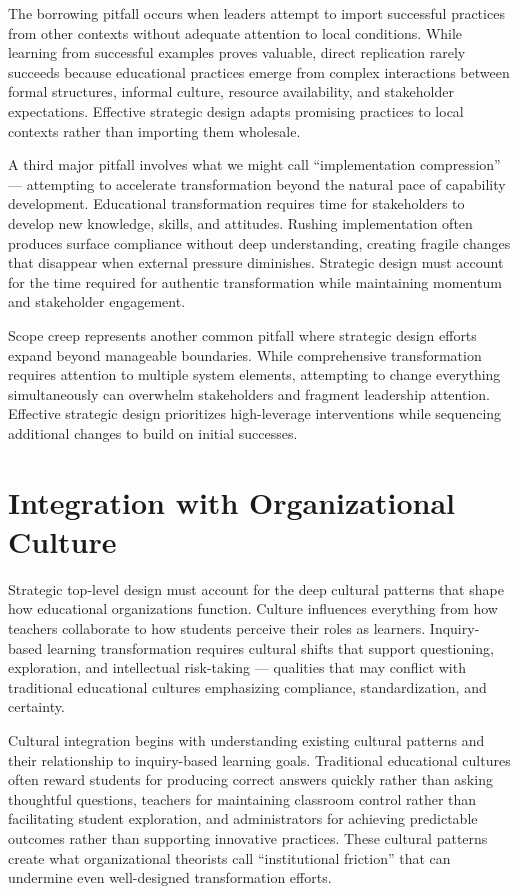 \documentclass[
  Letterpaper,
]{scrbook}
\begin{document}
The borrowing pitfall occurs when leaders attempt to import successful
practices from other contexts without adequate attention to local
conditions. While learning from successful examples proves valuable,
direct replication rarely succeeds because educational practices emerge
from complex interactions between formal structures, informal culture,
resource availability, and stakeholder expectations. Effective strategic
design adapts promising practices to local contexts rather than
importing them wholesale.

A third major pitfall involves what we might call ``implementation
compression'' --- attempting to accelerate transformation beyond the
natural pace of capability development. Educational transformation
requires time for stakeholders to develop new knowledge, skills, and
attitudes. Rushing implementation often produces surface compliance
without deep understanding, creating fragile changes that disappear when
external pressure diminishes. Strategic design must account for the time
required for authentic transformation while maintaining momentum and
stakeholder engagement.

Scope creep represents another common pitfall where strategic design
efforts expand beyond manageable boundaries. While comprehensive
transformation requires attention to multiple system elements,
attempting to change everything simultaneously can overwhelm
stakeholders and fragment leadership attention. Effective strategic
design prioritizes high-leverage interventions while sequencing
additional changes to build on initial successes.

\section{Integration with Organizational
Culture}\label{integration-with-organizational-culture}

Strategic top-level design must account for the deep cultural patterns
that shape how educational organizations function. Culture influences
everything from how teachers collaborate to how students perceive their
roles as learners. Inquiry-based learning transformation requires
cultural shifts that support questioning, exploration, and intellectual
risk-taking --- qualities that may conflict with traditional educational
cultures emphasizing compliance, standardization, and certainty.

Cultural integration begins with understanding existing cultural
patterns and their relationship to inquiry-based learning goals.
Traditional educational cultures often reward students for producing
correct answers quickly rather than asking thoughtful questions,
teachers for maintaining classroom control rather than facilitating
student exploration, and administrators for achieving predictable
outcomes rather than supporting innovative practices. These cultural
patterns create what organizational theorists call ``institutional
friction'' that can undermine even well-designed transformation efforts.
\end{document}
